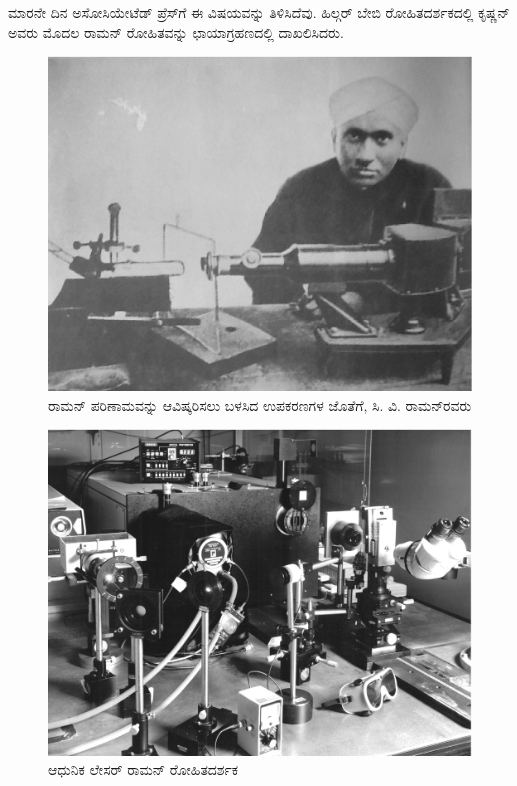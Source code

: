 ಮಾರನೇ ದಿನ ಅಸೋಸಿಯೇಟೆಡ್ ಪ್ರೆಸ್‍ಗೆ ಈ ವಿಷಯವನ್ನು ತಿಳಿಸಿದೆವು. ಹಿಲ್ಗರ್ ಬೇಬಿ ರೋಹಿತದರ್ಶಕದಲ್ಲಿ ಕೃಷ್ಣನ್ ಅವರು ಮೊದಲ ರಾಮನ್ ರೋಹಿತವನ್ನು ಛಾಯಾಗ್ರಹಣದಲ್ಲಿ ದಾಖಲಿಸಿದರು.

\begin{figure}
\includegraphics{"images/1.jpg"}
\caption{ರಾಮನ್ ಪರಿಣಾಮವನ್ನು ಆವಿಷ್ಕರಿಸಲು ಬಳಸಿದ ಉಪಕರಣಗಳ ಜೊತೆಗೆ, ಸಿ. ವಿ. ರಾಮನ್‍ರವರು}
\end{figure}


\begin{figure}
\includegraphics{"images/2.jpg"}
\caption{ಆಧುನಿಕ ಲೇಸರ್ ರಾಮನ್ ರೋಹಿತದರ್ಶಕ}
\end{figure}


